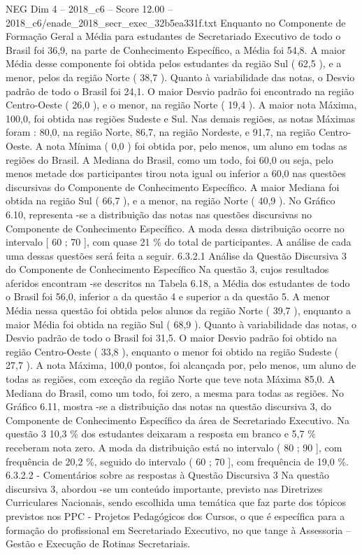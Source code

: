 \begin{textsample}{NEG Dim 4 – 2018\_c6 – Score 12.00 – 2018\_c6/enade\_2018\_secr\_exec\_32b5ea331f.txt}
Enquanto no Componente de Formação Geral a Média para estudantes de Secretariado Executivo de todo o Brasil foi 36,9, na parte de Conhecimento Específico, a Média foi 54,8.
A maior Média desse componente foi obtida pelos estudantes da região Sul ( 62,5 ), e a menor, pelos da região Norte ( 38,7 ).
Quanto à variabilidade das notas, o Desvio padrão de todo o Brasil foi 24,1.
O maior Desvio padrão foi encontrado na região Centro-Oeste ( 26,0 ), e o menor, na região Norte ( 19,4 ).
A maior nota Máxima, 100,0, foi obtida nas regiões Sudeste e Sul.
Nas demais regiões, as notas Máximas foram : 80,0, na região Norte, 86,7, na região Nordeste, e 91,7, na região Centro-Oeste.
A nota Mínima ( 0,0 ) foi obtida por, pelo menos, um aluno em todas as regiões do Brasil.
A Mediana do Brasil, como um todo, foi 60,0 ou seja, pelo menos metade dos participantes tirou nota igual ou inferior a 60,0 nas questões discursivas do Componente de Conhecimento Específico.
A maior Mediana foi obtida na região Sul ( 66,7 ), e a menor, na região Norte ( 40,9 ).
No Gráfico 6.10, representa -se a distribuição das notas nas questões discursivas no Componente de Conhecimento Específico.
A moda dessa distribuição ocorre no intervalo [ 60 ; 70 ], com quase 21 \% do total de participantes.
A análise de cada uma dessas questões será feita a seguir. 6.3.2.1 Análise da Questão Discursiva 3 do Componente de Conhecimento Específico Na questão 3, cujos resultados aferidos encontram -se descritos na Tabela 6.18, a Média dos estudantes de todo o Brasil foi 56,0, inferior a da questão 4 e superior a da questão 5.
A menor Média nessa questão foi obtida pelos alunos da região Norte ( 39,7 ), enquanto a maior Média foi obtida na região Sul ( 68,9 ).
Quanto à variabilidade das notas, o Desvio padrão de todo o Brasil foi 31,5.
O maior Desvio padrão foi obtido na região Centro-Oeste ( 33,8 ), enquanto o menor foi obtido na região Sudeste ( 27,7 ).
A nota Máxima, 100,0 pontos, foi alcançada por, pelo menos, um aluno de todas as regiões, com exceção da região Norte que teve nota Máxima 85,0.
A Mediana do Brasil, como um todo, foi zero, a mesma para todas as regiões.
No Gráfico 6.11, mostra -se a distribuição das notas na questão discursiva 3, do Componente de Conhecimento Específico da área de Secretariado Executivo.
Na questão 3 10,3 \% dos estudantes deixaram a resposta em branco e 5,7 \% receberam nota zero.
A moda da distribuição está no intervalo ( 80 ; 90 ], com frequência de 20,2 \%, seguido do intervalo ( 60 ; 70 ], com frequência de 19,0 \%. 6.3.2.2 - Comentários sobre as respostas à Questão Discursiva 3 Na questão discursiva 3, abordou -se um conteúdo importante, previsto nas Diretrizes Curriculares Nacionais, sendo escolhida uma temática que faz parte dos tópicos previstos nos PPC - Projetos Pedagógicos dos Cursos, o que é específica para a formação do profissional em Secretariado Executivo, no que tange à Assessoria – Gestão e Execução de Rotinas Secretariais.

\end{textsample}

